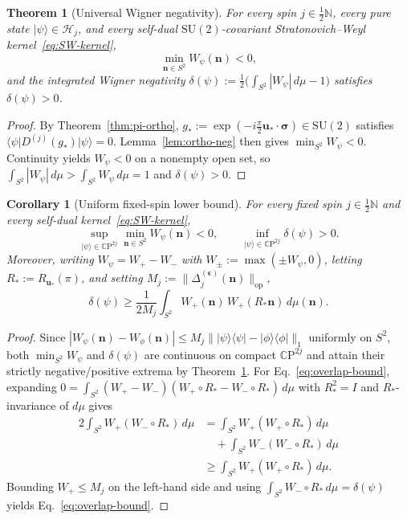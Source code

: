 \documentclass[aps,prl,reprint,amsmath,amssymb,nofootinbib,floatfix]{revtex4-2}
\newtheorem{theorem}{Theorem}
\newtheorem{corollary}{Corollary}
\newcommand{\ket}[1]{\lvert #1 \rangle}
\newcommand{\bra}[1]{\langle #1 \rvert}
\newcommand{\bn}{\mathbf{n}}
\newcommand{\bu}{\mathbf{u}}
\begin{document}
\begin{theorem}[Universal Wigner negativity]\label{thm:main}
For every spin $j \in \frac{1}{2}\mathbb{N}$, every pure state $\ket{\psi} \in \mathcal{H}_j$, and every self-dual $\mathrm{SU}(2)$-covariant Stratonovich--Weyl kernel~\eqref{eq:SW-kernel},
\begin{equation}
\min_{\bn \in S^2} W_\psi(\bn) < 0,
\end{equation}
and the integrated Wigner negativity $\delta(\psi) := \frac{1}{2}\big(\int_{S^2} |W_\psi|\,d\mu - 1\big)$ satisfies $\delta(\psi) > 0$.
\end{theorem}

\begin{proof}
By Theorem~\ref{thm:pi-ortho}, $g_* := \exp(-i\frac{\pi}{2}\bu_*\cdot\boldsymbol{\sigma}) \in \mathrm{SU}(2)$ satisfies $\bra{\psi}D^{(j)}(g_*)\ket{\psi} = 0$. Lemma~\ref{lem:ortho-neg} then gives $\min_{S^2} W_\psi < 0$. Continuity yields $W_\psi < 0$ on a nonempty open set, so $\int_{S^2}|W_\psi|\,d\mu > \int_{S^2} W_\psi\,d\mu = 1$ and $\delta(\psi) > 0$.
\end{proof}

\begin{corollary}[Uniform fixed-spin lower bound]\label{cor:uniform}
For every fixed spin $j \in \frac{1}{2}\mathbb{N}$ and every self-dual kernel~\eqref{eq:SW-kernel},
\begin{equation}
\sup_{\ket{\psi}\in\mathbb{C}\mathrm{P}^{2j}} \min_{\bn\in S^2} W_\psi(\bn) < 0,
\qquad
\inf_{\ket{\psi}\in\mathbb{C}\mathrm{P}^{2j}} \delta(\psi) > 0.
\end{equation}
Moreover, writing $W_\psi = W_+ - W_-$ with $W_\pm := \max(\pm W_\psi, 0)$, letting $R_* := R_{\bu_*}(\pi)$, and setting $M_j := \|\Delta_j^{(\boldsymbol{\epsilon})}(\bn)\|_{\mathrm{op}}$,
\begin{equation}\label{eq:overlap-bound}
\delta(\psi) \ge \frac{1}{2M_j} \int_{S^2} W_+(\bn)\,W_+(R_*\bn)\,d\mu(\bn).
\end{equation}
\end{corollary}

\begin{proof}
Since $|W_\psi(\bn) - W_\phi(\bn)| \le M_j\|\ket{\psi}\bra{\psi} - \ket{\phi}\bra{\phi}\|_1$ uniformly on $S^2$, both $\min_{S^2} W_\psi$ and $\delta(\psi)$ are continuous on compact $\mathbb{C}\mathrm{P}^{2j}$ and attain their strictly negative/positive extrema by Theorem~\ref{thm:main}. For Eq.~\eqref{eq:overlap-bound}, expanding $0 = \int_{S^2}(W_+ - W_-)(W_+\circ R_* - W_-\circ R_*)\,d\mu$ with $R_*^2 = I$ and $R_*$-invariance of $d\mu$ gives
\begin{align}
2\!\int_{S^2}\! W_+ (W_-\!\circ R_*)\,d\mu
&= \!\int_{S^2}\! W_+(W_+\!\circ R_*)\,d\mu \nonumber\\
&\quad + \!\int_{S^2}\! W_-(W_-\!\circ R_*)\,d\mu \nonumber\\
&\ge \!\int_{S^2}\! W_+(W_+\!\circ R_*)\,d\mu.
\end{align}
Bounding $W_+ \le M_j$ on the left-hand side and using $\int_{S^2} W_-\circ R_*\,d\mu = \delta(\psi)$ yields Eq.~\eqref{eq:overlap-bound}.
\end{proof}
\end{document}
